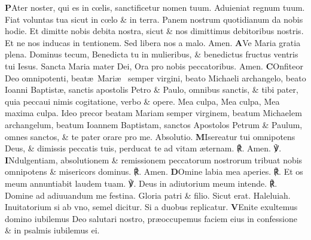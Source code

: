 \documentclass[a5paper,10pt]{book}
\def\leftmarginnote{%
	\xymarginnote{\hskip -\marginparsep \hskip -2.5em}}
\def\Vbar{℣}
\def\Rbar{℟}
\def\ae{æ}
\def\oe{œ}
\begin{document}
\begin{multicols*}{2}
\lettrine[lines=2]{\bfseries \color{red} P}{}Ater noster, qui es in c\oe lis, sanctificetur %
nomen tuum. Aduieniat regnum tuum. Fiat voluntas tua sicut in c\oe lo \& in terra. Panem nostrum quotidianum da nobis hodie. Et dimitte nobis debita nostra, sicut \& nos dimittimus debitoribus nostris. Et ne nos inducas in tentionem. Sed libera nos a malo. Amen.
\lettrine[lines=2]{\bfseries \color{red} A}{}Ve Maria gratia plena. Dominus tecum, Benedicta tu in mulieribus, \& benedictus fructus ventris tui Iesus. Sancta Maria mater Dei, Ora pro nobis peccatoribus. Amen.
\leftmarginnote{no\\yes}
\lettrine[lines=2]{\bfseries \color{red} C}{}Onfiteor Deo omnipotenti, beat\ae \ Mari\ae \ %
semper virgini, beato Michaeli archangelo, beato Ioanni Baptist\ae , %
sanctis apostolis Petro \& Paulo, omnibus sanctis, \& \color{red} tibi pater, \color{black} quia peccaui nimis cogitatione, verbo \& opere. Mea culpa, Mea culpa, Mea maxima culpa. Ideo precor beatam Mariam semper virginem, beatum Michaelem archangelum, beatum Ioannem Baptistam, sanctos Apostolos Petrum \& Paulum, omnes sanctos, \& \color{red} te pater \color{black} orare pro me. \quad \color{red} Absolutio. \color{black}
\lettrine[lines=2]{\bfseries \color{red} M}{}Isereatur \color{red} tui \color{black} omnipotens Deus, \& dimissis peccatis \color{red} tuis, \color{black} perducat \color{red} te \color{black} ad vitam \ae ternam. \color{red} \Rbar . \color{black} Amen. \color{red} \Vbar . \color{black}
\lettrine[lines=2]{\bfseries \color{red} I}{}Ndulgentiam, absolutionem \& remissionem peccatorum nostrorum tribuat nobis omnipotens \& misericors dominus. \color{red} \Rbar . \color{black} Amen.
\vspace{-.25em}
\lettrine[lines=2]{\bfseries \color{red} D}{}Omine labia mea aperies.
\newline \color{red} \Rbar . \color{black} Et os meum annuntiabit laudem tuam. \color{red} \Vbar . \color{black} Deus in adiutorium meum intende. \color{red} \Rbar . \color{black} Domine ad adiuuandum me festina. Gloria patri \& filio. Sicut erat. Haleluiah.
\newline
\color{red} Inuitatorium si ab vno, semel dicitur. Si a duobus replicatur. \color{black}
\vspace{-.25em}
\lettrine[lines=2]{\bfseries \color{red} V}{}Enite exultemus domino iubilemus Deo salutari nostro, pr\ae occupemus faciem eius in confessione \& in psalmis iubilemus ei.

\end{multicols*}
\end{document}
